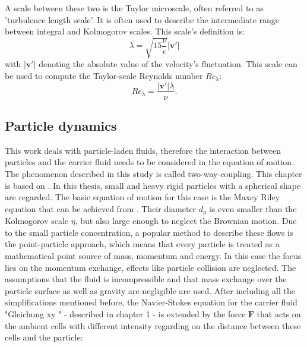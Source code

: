 \documentclass[11pt,a4paper,openany,oneside,parskip=half*]{article}
\renewcommand*\vec[1]{\boldsymbol{#1}}
\begin{document}
\newline
A scale between these two is the Taylor microscale, often referred to as 'turbulence length scale'. 
It is often used to describe the intermediate range between integral and Kolmogorov scales. 
This scale's definition is: 
\begin{equation}
\lambda = \sqrt{15 \frac{\nu}{\epsilon}} |\vec{v'}|
\end{equation}
with $|\vec{v'}|$ denoting the absolute value of the velocity's fluctuation. This scale can be used to compute the Taylor-scale Reynolds number $Re_\mathrm{\lambda}$:
\begin{equation}
Re_\mathrm{\lambda} = \frac{|\vec{v'}| \lambda}{\nu}.
\end{equation}
\pagebreak
\subsection{Particle dynamics} %
This work deals with particle-laden fluids, therefore the interaction between particles and the carrier fluid needs to be considered in the equation of motion. The phenomenon described in this study is called two-way-coupling. This chapter is based on \cite{computationalMethodsforMultiphaseFlow}.
\newline
In this thesis, small and heavy rigid particles with a spherical shape are regarded. The basic equation of motion for this case is the Maxey Riley equation that can be achieved from \cite{EquationOfMotionForASmallRigidSphereInANonuniformFlow}. Their diameter $ d_\mathrm{p} $ is even smaller than the Kolmogorov scale $ \eta $, but also large enough to neglect the Brownian motion.
\newline
Due to the small particle concentration, a popular method to describe these flows is the point-particle approach, which means that every particle is treated as a mathematical point source of mass, momentum and energy. In this case the focus lies on the momentum exchange, effects like particle collision are neglected.
\newline
The assumptions that the fluid is incompressible and that mass exchange over the particle surface as well as gravity are negligible are used. 
After including all the simplifications mentioned before, the Navier-Stokes equation for the carrier fluid "Gleichung xy " - described in chapter 1 - is extended by the force $\vec{F}$ that acts on the ambient cells with different intensity regarding on the distance between these cells and the particle:
\end{document}
